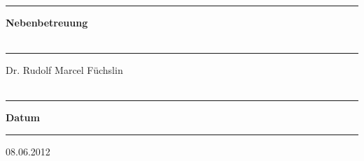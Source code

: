 \begin{titlepage}
\begin{minipage}[b]{0.91\textwidth}
	\begin{minipage}[b]{0.27\textwidth}
	\hrule\vskip 0.5cm
		\textbf{Nebenbetreuung}\\
		\\
	\end{minipage}
	\begin{minipage}[b]{0.03\textwidth}
	\hskip 0.5cm
	\end{minipage}
	\begin{minipage}[b]{0.6\textwidth}
	\hrule\vskip 0.5cm
		Dr. Rudolf Marcel Füchslin\\
		\\
	\end{minipage}
	
	\begin{minipage}[b]{0.27\textwidth}
	\hrule\vskip 0.5cm
		\textbf{Datum}
	\end{minipage}
	\begin{minipage}[b]{0.03\textwidth}
	\hskip 0.5cm
	\end{minipage}
	\begin{minipage}[b]{0.6\textwidth}
	\hrule\vskip 0.5cm
		08.06.2012
	\end{minipage}
\end{minipage}
\vskip 0.5cm


\end{titlepage}
